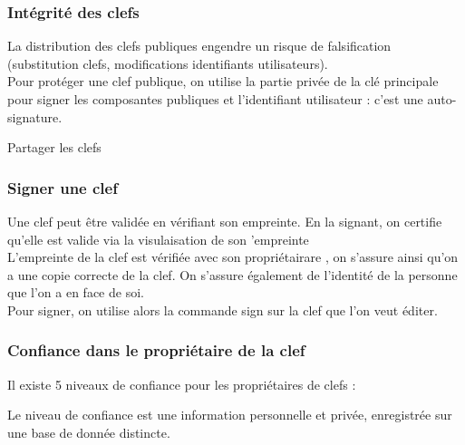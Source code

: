 \documentclass{beamer}
\begin{document}
\begin{frame}
\frametitle{Intégrité des clefs}
La distribution des clefs publiques engendre un risque de falsification (substitution clefs, modifications identifiants utilisateurs).
\\
Pour protéger une clef publique, on utilise la partie privée de la clé principale pour signer les composantes publiques et l’identifiant utilisateur : c’est une auto-signature.
\end{frame}

\begin{frame}
\begin{center}
\Huge{Partager les clefs }
\end{center}
\end{frame}


\begin{frame}
\frametitle{Signer une clef}

Une clef peut être validée en vérifiant son empreinte. En la signant, on certifie qu’elle est valide via la visulaisation de son ’empreinte
\\
L’empreinte de la clef est vérifiée avec son propriétairare , on s’assure ainsi qu’on a une copie correcte de la clef. On s’assure également de l’identité de la personne que l’on a en face de soi.
\\
 Pour signer, on utilise alors la commande sign sur la clef que l’on veut éditer.
\end{frame}


\begin{frame}
\frametitle{Confiance dans le propriétaire de la clef}

Il existe 5 niveaux de confiance pour les propriétaires de clefs :
\begin{itemize}
\end{itemize}
Le niveau de confiance est une information personnelle et privée, enregistrée sur une base de donnée distincte.
\end{frame}
\end{document}

